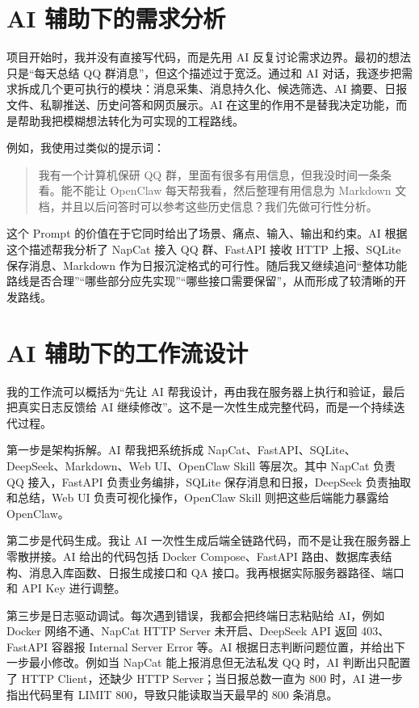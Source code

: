 \documentclass[conference]{IEEEtran}
\begin{document}
\section{AI 辅助下的需求分析}

项目开始时，我并没有直接写代码，而是先用 AI 反复讨论需求边界。最初的想法只是“每天总结 QQ 群消息”，但这个描述过于宽泛。通过和 AI 对话，我逐步把需求拆成几个更可执行的模块：消息采集、消息持久化、候选筛选、AI 摘要、日报文件、私聊推送、历史问答和网页展示。AI 在这里的作用不是替我决定功能，而是帮助我把模糊想法转化为可实现的工程路线。

例如，我使用过类似的提示词：

\begin{quote}
我有一个计算机保研 QQ 群，里面有很多有用信息，但我没时间一条条看。能不能让 OpenClaw 每天帮我看，然后整理有用信息为 Markdown 文档，并且以后问答时可以参考这些历史信息？我们先做可行性分析。
\end{quote}

这个 Prompt 的价值在于它同时给出了场景、痛点、输入、输出和约束。AI 根据这个描述帮我分析了 NapCat 接入 QQ 群、FastAPI 接收 HTTP 上报、SQLite 保存消息、Markdown 作为日报沉淀格式的可行性。随后我又继续追问“整体功能路线是否合理”“哪些部分应先实现”“哪些接口需要保留”，从而形成了较清晰的开发路线。

\section{AI 辅助下的工作流设计}

我的工作流可以概括为“先让 AI 帮我设计，再由我在服务器上执行和验证，最后把真实日志反馈给 AI 继续修改”。这不是一次性生成完整代码，而是一个持续迭代过程。

第一步是架构拆解。AI 帮我把系统拆成 NapCat、FastAPI、SQLite、DeepSeek、Markdown、Web UI、OpenClaw Skill 等层次。其中 NapCat 负责 QQ 接入，FastAPI 负责业务编排，SQLite 保存消息和日报，DeepSeek 负责抽取和总结，Web UI 负责可视化操作，OpenClaw Skill 则把这些后端能力暴露给 OpenClaw。

第二步是代码生成。我让 AI 一次性生成后端全链路代码，而不是让我在服务器上零散拼接。AI 给出的代码包括 Docker Compose、FastAPI 路由、数据库表结构、消息入库函数、日报生成接口和 QA 接口。我再根据实际服务器路径、端口和 API Key 进行调整。

第三步是日志驱动调试。每次遇到错误，我都会把终端日志粘贴给 AI，例如 Docker 网络不通、NapCat HTTP Server 未开启、DeepSeek API 返回 403、FastAPI 容器报 Internal Server Error 等。AI 根据日志判断问题位置，并给出下一步最小修改。例如当 NapCat 能上报消息但无法私发 QQ 时，AI 判断出只配置了 HTTP Client，还缺少 HTTP Server；当日报总数一直为 800 时，AI 进一步指出代码里有 LIMIT 800，导致只能读取当天最早的 800 条消息。
\end{document}
